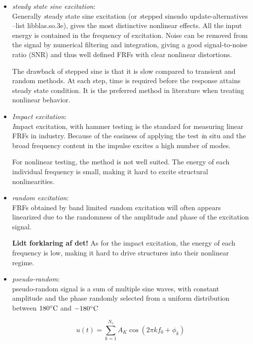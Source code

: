 \begin{itemize}
\item \textit{steady state sine excitation}:\\
  Generally {\textit steady state sine excitation} (or {\textit stepped sinsudo update-alternatives --list libblas.so.3e}), gives
  the most distinctive nonlinear effects. All the input energy is contained in
  the frequency of excitation. Noise can be removed from the signal by numerical
  filtering and integration, giving a good signal-to-noise ratio (SNR) and thus well
  defined FRFs with clear nonlinear distortions.
  
  The drawback of stepped sine is that it is slow compared to transient and
  random methods. At each step, time is required before the response attains
  steady state condition. It is the preferred method in literature when treating
  nonlinear behavior.

\item \textit{Impact excitation}:\\
  {\textit Impact excitation}, with hammer testing is the standard for measuring
  linear FRFs in industry. Because of the easiness of applying the test {\textit in
    situ} and the broad frequency content in the impulse excites a high number
  of modes.

  For nonlinear testing, the method is not well suited. The energy of each
  individual frequency is small, making it hard to excite structural
  nonlinearities.

\item \textit{random excitation}:\\
  FRFs obtained by band limited {\textit random excitation} will often appears
  linearized due to the randomness of the amplitude and phase of the excitation
  signal.

  \textbf{Lidt forklaring af det!} As for the impact excitation, the energy of
  each frequency is low, making it hard to drive structures into their nonlinear
  regime.

\item \textit{pseudo-random}:\\
  pseudo-random signal is a sum of multiple sine waves, with constant amplitude
  and the phase randomly selected from a uniform distribution between $180
  ^\circ \mathrm{C}$ and $-180 ^\circ \mathrm{C}$

  \begin{equation}
    \label{eq:multiple-sine}
    u(t) = \sum_{k=1}^{N_s} A_K \cos \left( 2 \pi k f_0 + \phi_k \right)
  \end{equation}


\end{itemize}

